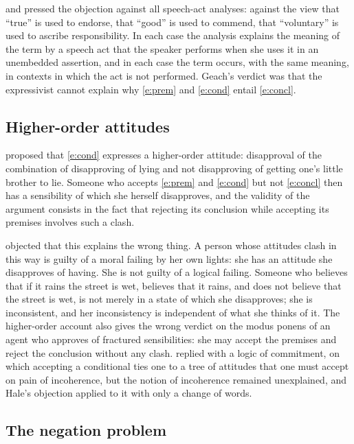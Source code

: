 \documentclass{situationist-preprint}
\begin{document}
\citet{Geach1960,Geach1965} and \citet{Searle1962} pressed the objection against all speech-act analyses: against the view that \enquote{true} is used to endorse, that \enquote{good} is used to commend, that \enquote{voluntary} is used to ascribe responsibility. In each case the analysis explains the meaning of the term by a speech act that the speaker performs when she uses it in an unembedded assertion, and in each case the term occurs, with the same meaning, in contexts in which the act is not performed. Geach's verdict was that the expressivist cannot explain why \ref{e:prem} and \ref{e:cond} entail \ref{e:concl}.

\subsection{Higher-order attitudes}

\citet{Blackburn1984} proposed that \ref{e:cond} expresses a higher-order attitude: disapproval of the combination of disapproving of lying and not disapproving of getting one's little brother to lie. Someone who accepts \ref{e:prem} and \ref{e:cond} but not \ref{e:concl} then has a sensibility of which she herself disapproves, and the validity of the argument consists in the fact that rejecting its conclusion while accepting its premises involves such a clash.

\citet{Hale1993} objected that this explains the wrong thing. A person whose attitudes clash in this way is guilty of a moral failing by her own lights: she has an attitude she disapproves of having. She is not guilty of a logical failing. Someone who believes that if it rains the street is wet, believes that it rains, and does not believe that the street is wet, is not merely in a state of which she disapproves; she is inconsistent, and her inconsistency is independent of what she thinks of it. The higher-order account also gives the wrong verdict on the modus ponens of an agent who approves of fractured sensibilities: she may accept the premises and reject the conclusion without any clash. \citet{Blackburn1988} replied with a logic of commitment, on which accepting a conditional ties one to a tree of attitudes that one must accept on pain of incoherence, but the notion of incoherence remained unexplained, and Hale's objection applied to it with only a change of words.

\subsection{The negation problem}
\end{document}
